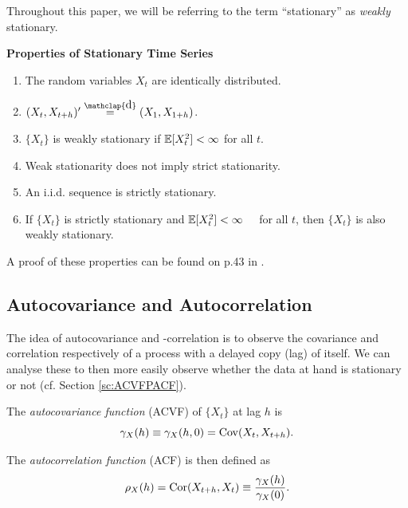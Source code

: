 \documentclass[a4paper, oneside]{discothesis}
\begin{document}
Throughout this paper, we will be referring to the term ``stationary'' as \textit{weakly} stationary.


\textbf{Properties of Stationary Time Series} %

\begin{enumerate}
    \item The random variables $X_t$ are identically distributed.
    \item $(X_t, X_{t+h})' \stackrel{\mathclap{\normalfont\mbox{d}}}{=} (X_1, X_{1+h})$.
    \item $\{X_t\}$ is weakly stationary if $\operatorname{\mathbb{E}}[X_t^2] < \infty$ for all $t$.
    \item Weak stationarity does not imply strict stationarity.
    \item An i.i.d. sequence is strictly stationary.
    \item If $\{X_t\}$ is strictly stationary and $\operatorname{\mathbb{E}}[X_t^2] < \infty \quad$ for all $t$, then $\{X_t\}$ is also weakly stationary.
\end{enumerate}
A proof of these properties can be found on p.43 in \cite{itsf}.

\subsection{Autocovariance and Autocorrelation}

The idea of autocovariance and -correlation is to observe the covariance and correlation respectively of a process with a delayed copy (lag) of itself. We can analyse these to then more easily observe whether the data at hand is stationary or not (cf. Section \ref{sc:ACVFPACF}).

\begin{definition}
The \textit{autocovariance function} (ACVF) of $\{X_t\}$ at lag $h$ is
\begin{equation}
	\gamma_X(h) \equiv \gamma_X(h, 0) = \operatorname{\mathrm{Cov}}(X_t, X_{t+h}).
\end{equation}

The \textit{autocorrelation function} (ACF) is then defined as
\begin{equation}
    \rho_X(h) = \operatorname{\mathrm{Cor}}(X_{t+h}, X_t) \equiv \frac{\gamma_X(h)}{\gamma_X(0)}.
\end{equation}
\end{definition}
\end{document}
